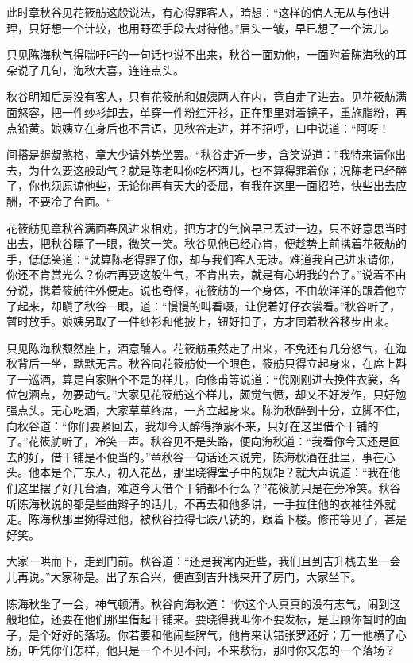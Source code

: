 \documentclass[12pt,UTF8]{ctexbook}
\begin{document}
{{{此时章秋谷见花筱舫这般说法，有心得罪客人，暗想：“这样的倌人无从与他讲理，只好想一个计较，也用野蛮手段去对待他。”眉头一皱，早已想了一个法儿。

只见陈海秋气得喘吁吁的一句话也说不出来，秋谷一面劝他，一面附着陈海秋的耳朵说了几句，海秋大喜，连连点头。

秋谷明知后房没有客人，只有花筱舫和娘姨两人在内，竟自走了进去。见花筱舫满面怒容，把一件纱衫卸去，单穿一件粉红汗衫，正在那里对着镜子，重施脂粉，再点铅黄。娘姨立在身后也不言语，见秋谷走进，并不招呼，口中说道：“阿呀！

间搭是龌龊煞格，章大少请外势坐罢。“秋谷走近一步，含笑说道：”我特来请你出去，为什么要这般动气？就是陈老叫你吃杯酒儿，也不算得罪着你；况陈老已经醉了，你也须原谅他些，无论你再有天大的委屈，有我在这里一面招陪，快些出去应酬，不要冷了台面。“

花筱舫见章秋谷满面春风进来相劝，把方才的气恼早已丢过一边，只不好意思当时出去，把秋谷瞟了一眼，微笑一笑。秋谷见他已经心肯，便趁势上前携着花筱舫的手，低低笑道：“就算陈老得罪了你，却与我们客人无涉。难道我自己进来请你，你还不肯赏光么？你若再要这般生气，不肯出去，就是有心坍我的台了。”说着不由分说，携着筱舫往外便走。说也奇怪，花筱舫的一个身体，不由软洋洋的跟着他立了起来，却瞋了秋谷一眼，道：“慢慢的叫看嗫，让倪着好仔衣裳看。”秋谷听了，暂时放手。娘姨另取了一件纱衫和他披上，钮好扣子，方才同着秋谷移步出来。

只见陈海秋颓然座上，酒意醺人。花筱舫虽然走了出来，不免还有几分怒气，在海秋背后一坐，默默无言。秋谷向花筱舫使一个眼色，筱舫只得立起身来，在席上斟了一巡酒，算是自家赔个不是的样儿，向修甫等说道：“倪刚刚进去换件衣裳，各位包涵点，勿要动气。”大家见花筱舫这个样儿，颇觉气愤，却又不好发作，只好勉强点头。无心吃酒，大家草草终席，一齐立起身来。陈海秋醉到十分，立脚不住，向秋谷道：“你们要紧回去，我却今天醉得挣紥不来，只好在这里借个干铺的了。”花筱舫听了，冷笑一声。秋谷见不是头路，便向海秋道：“我看你今天还是回去的好，借干铺是不便当的。”章秋谷一句话还未说完，陈海秋酒在肚里，事在心头。他本是个广东人，初入花丛，那里晓得堂子中的规矩？就大声说道：“我在他们这里摆了好几台酒，难道今天借个干铺都不行么？”花筱舫只是在旁冷笑。秋谷听陈海秋说的都是些曲辫子的话儿，不再去和他多讲，一手拉住他的衣袖往外就走。陈海秋那里拗得过他，被秋谷拉得七跌八铳的，跟着下楼。修甫等见了，甚是好笑。

大家一哄而下，走到门前。秋谷道：“还是我寓内近些，我们且到吉升栈去坐一会儿再说。”大家称是。出了东合兴，便直到吉升栈来开了房门，大家坐下。

陈海秋坐了一会，神气顿清。秋谷向海秋道：“你这个人真真的没有志气，闹到这般地位，还要在他们那里借起干铺来。要晓得我叫你不要发标，是卫顾你暂时的面子，是个好好的落场。你若要和他闹些脾气，他肯来认错张罗还好；万一他横了心肠，听凭你们怎样，他只是一个不见不闻，不来敷衍，那时你又怎的一个落场？

}}}
\end{document}

